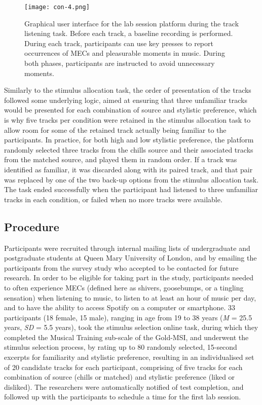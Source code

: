\begin{figure}[t!]
\texttt{[image: con-4.png]}
\centering
\caption{Graphical user interface for the lab session platform during the track listening task. Before each track, a baseline recording is performed. During each track, participants can use key presses to report occurrences of MECs and pleasurable moments in music. During both phases, participants are instructed to avoid unnecessary moments.}
\label{fig:con-4}
\end{figure}

Similarly to the stimulus allocation task, the order of presentation of the tracks followed some underlying logic, aimed at ensuring that three unfamiliar tracks would be presented for each combination of source and stylistic preference, which is why five tracks per condition were retained in the stimulus allocation task to allow room for some of the retained track actually being familiar to the participants. In practice, for both high and low stylistic preference, the platform randomly selected three tracks from the chills source and their associated tracks from the matched source, and played them in random order. If a track was identified as familiar, it was discarded along with its paired track, and that pair was replaced by one of the two back-up options from the stimulus allocation task. The task ended successfully when the participant had listened to three unfamiliar tracks in each condition, or failed when no more tracks were available.

\subsection{Procedure}

Participants were recruited through internal mailing lists of undergraduate and postgraduate students at Queen Mary University of London, and by emailing the participants from the survey study who accepted to be contacted for future research. In order to be eligible for taking part in the study, participants needed to often experience MECs (deﬁned here as shivers, goosebumps, or a tingling sensation) when listening to music, to listen to at least an hour of music per day, and to have the ability to access Spotify on a computer or smartphone. 33 participants (18 female, 15 male), ranging in age from 19 to 38 years (\emph{M} = 25.5 years, \emph{SD} = 5.5 years), took the stimulus selection online task, during which they completed the Musical Training sub-scale of the Gold-MSI, and underwent the stimulus selection process, by rating up to 80 randomly selected, 15-second excerpts for familiarity and stylistic preference, resulting in an individualised set of 20 candidate tracks for each participant, comprising of five tracks for each combination of source (chills or matched) and stylistic preference (liked or disliked). The researchers were automatically notified of test completion, and followed up with the participants to schedule a time for the first lab session.


